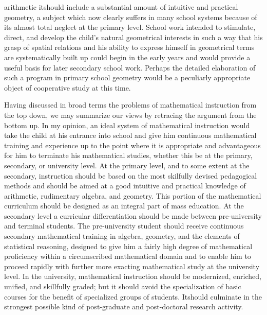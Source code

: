 arithmetic it\pageoriginale should include a substantial amount of intuitive and practical geometry, a subject which now clearly suffers in many school systems because of its almost total neglect at the primary level. School work intended to stimulate, direct, and develop the child's natural geometrical interests in such a way that his grasp of spatial relations and his ability to express himself in geometrical terms are systematically built up could begin in the early years and would provide a useful basis for later secondary school work. Perhaps the detailed elaboration of such a program in primary school geometry would be a peculiarly appropriate object of cooperative study at this time.

Having discussed in broad terms the problems of mathematical instruction from the top down, we may summarize our views by retracing the argument from the bottom up. In my opinion, an ideal system of mathematical instruction would take the child at his entrance into school and give him continuous mathematical training and experience up to the point where it is appropriate and advantageous for him to terminate his mathematical studies, whether this be at the primary, secondary, or university level. At the primary level, and to some extent at the secondary, instruction should be based on the most skilfully devised pedagogical methods and should be aimed at a good intuitive and practical knowledge of arithmetic, rudimentary algebra, and geometry. This portion of the mathematical curriculum should be designed as an integral part of mass education. At the secondary level a curricular differentiation should be made between pre-university and terminal students. The pre-university student should receive continuous secondary mathematical training in algebra, geometry, and the elements of statistical reasoning, designed to give him a fairly high degree of mathematical proficiency within a circumscribed mathematical domain and to enable him to proceed rapidly with further more exacting mathematical study at the university level. In the university, mathematical instruction should be modernized, enriched, unified, and skillfully graded; but it should avoid the specialization of basic courses for the benefit of specialized groups of students. It\pageoriginale should culminate in the strongest possible kind of post-graduate and post-doctoral research activity.

